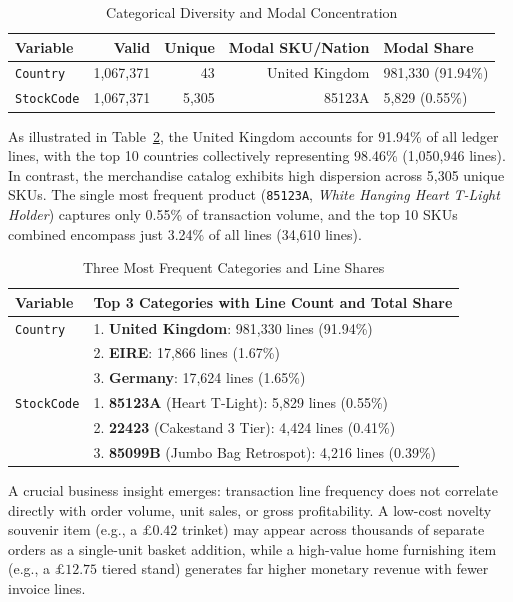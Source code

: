 \documentclass[journal,10pt,twocolumn]{IEEEtran}
\begin{document}
\begin{table}[htbp]
\caption{Categorical Diversity and Modal Concentration}
\label{tab:cat_summary}
\centering
\begin{tabularx}{\columnwidth}{lrrrX}
\toprule
\textbf{Variable} & \textbf{Valid} & \textbf{Unique} & \textbf{Modal SKU/Nation} & \textbf{Modal Share} \\
\midrule
\texttt{Country} & 1,067,371 & 43 & United Kingdom & 981,330 (91.94\%) \\
\texttt{StockCode} & 1,067,371 & 5,305 & 85123A & 5,829 (0.55\%) \\
\bottomrule
\end{tabularx}
\end{table}

As illustrated in Table~\ref{tab:top3_categories}, the United Kingdom accounts for 91.94\% of all ledger lines, with the top 10 countries collectively representing 98.46\% (1,050,946 lines). In contrast, the merchandise catalog exhibits high dispersion across 5,305 unique SKUs. The single most frequent product (\texttt{85123A}, \textit{White Hanging Heart T-Light Holder}) captures only 0.55\% of transaction volume, and the top 10 SKUs combined encompass just 3.24\% of all lines (34,610 lines).

\begin{table}[htbp]
\caption{Three Most Frequent Categories and Line Shares}
\label{tab:top3_categories}
\centering
\begin{tabularx}{\columnwidth}{lX}
\toprule
\textbf{Variable} & \textbf{Top 3 Categories with Line Count and Total Share} \\
\midrule
\texttt{Country} & 1. \textbf{United Kingdom}: 981,330 lines (91.94\%) \\
& 2. \textbf{EIRE}: 17,866 lines (1.67\%) \\
& 3. \textbf{Germany}: 17,624 lines (1.65\%) \\
\midrule
\texttt{StockCode} & 1. \textbf{85123A} (Heart T-Light): 5,829 lines (0.55\%) \\
& 2. \textbf{22423} (Cakestand 3 Tier): 4,424 lines (0.41\%) \\
& 3. \textbf{85099B} (Jumbo Bag Retrospot): 4,216 lines (0.39\%) \\
\bottomrule
\end{tabularx}
\end{table}

A crucial business insight emerges: transaction line frequency does not correlate directly with order volume, unit sales, or gross profitability. A low-cost novelty souvenir item (e.g., a $\pounds 0.42$ trinket) may appear across thousands of separate orders as a single-unit basket addition, while a high-value home furnishing item (e.g., a $\pounds 12.75$ tiered stand) generates far higher monetary revenue with fewer invoice lines.
\end{document}
